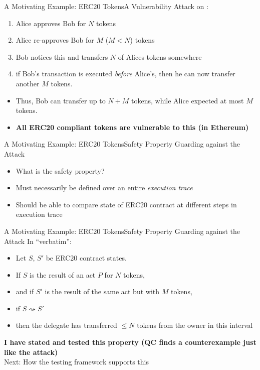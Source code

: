 \begin{frame}{A Motivating Example: ERC20 Tokens}{A Vulnerability}
Attack on :
\begin{enumerate}
    \item Alice approves Bob for $N$ tokens
    \item Alice re-approves Bob for $M$ ($M < N$) tokens
    \item Bob notices this and transfers $N$ of Alices tokens somewhere
    \item if Bob's transaction is executed \textit{before} Alice's, then he can now transfer another $M$ tokens.
\end{enumerate}
\begin{itemize}
    \item Thus, Bob can transfer up to $N + M$ tokens, while Alice expected at most $M$ tokens.
    \item \textbf{All ERC20 compliant tokens are vulnerable to this (in Ethereum)}
\end{itemize}
\end{frame}

\begin{frame}{A Motivating Example: ERC20 Tokens}{Safety Property Guarding against the Attack}
\begin{itemize}
    \item What is the safety property?
    \item Must necessarily be defined over an entire \textit{execution trace} \item Should be able to compare state of ERC20 contract at different steps in execution trace
\end{itemize}
\end{frame}

\begin{frame}{A Motivating Example: ERC20 Tokens}{Safety Property Guarding against the Attack}
In ``verbatim'':
\begin{itemize}
    \item Let $S$, $S'$ be ERC20 contract states.
    \item If $S$ is the result of an  act $P$ for $N$ tokens,
    \item and if $S'$ is the result of the same  act but with $M$ tokens,
    \item if $S \rightsquigarrow S'$
    \item then the delegate has transferred $\le N$ tokens from the owner in this interval
\end{itemize}
\textbf{I have stated and tested this property (QC finds a counterexample just like the attack)}\\
Next: How the testing framework supports this
\end{frame}
